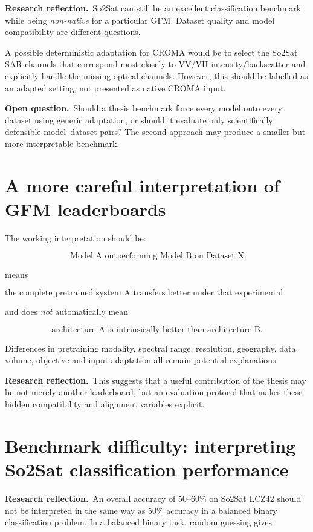 \documentclass[11pt,a4paper]{article}
\newcommand{\reflection}{\textcolor{reflectionorange}{\textbf{Research reflection.}}}
\newcommand{\openquestion}{\textcolor{questionblue}{\textbf{Open question.}}}
\begin{document}
\reflection\ So2Sat can still be an excellent classification benchmark while being
\emph{non-native} for a particular GFM. Dataset quality and model compatibility are different
questions.

A possible deterministic adaptation for CROMA would be to select the So2Sat SAR channels
that correspond most closely to VV/VH intensity/backscatter and explicitly handle the missing
optical channels. However, this should be labelled as an adapted setting, not presented as
native CROMA input.

\openquestion\ Should a thesis benchmark force every model onto every dataset using generic
adaptation, or should it evaluate only scientifically defensible model--dataset pairs? The
second approach may produce a smaller but more interpretable benchmark.

\section{A more careful interpretation of GFM leaderboards}

The working interpretation should be:

\[
\boxed{
\text{Model A outperforming Model B on Dataset X}
}
\]

means

\[
\boxed{
\text{the complete pretrained system A transfers better under that experimental configuration}
}
\]

and does \emph{not} automatically mean

\[
\boxed{
\text{architecture A is intrinsically better than architecture B}.
}
\]

Differences in pretraining modality, spectral range, resolution, geography, data volume,
objective and input adaptation all remain potential explanations.

\reflection\ This suggests that a useful contribution of the thesis may be not merely another
leaderboard, but an evaluation protocol that makes these hidden compatibility and alignment
variables explicit.

\section{Benchmark difficulty: interpreting So2Sat classification performance}

\reflection\ An overall accuracy of 50--60\% on So2Sat LCZ42 should not be interpreted in
the same way as 50\% accuracy in a balanced binary classification problem. In a balanced
binary task, random guessing gives
\end{document}
